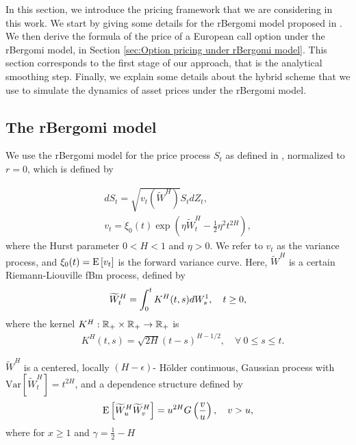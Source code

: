 In this section, we introduce the pricing framework that we are considering in this work. We start  by giving some details for the rBergomi model proposed in \cite{bayer2016pricing}. We then derive the formula of the price of a European call option under the rBergomi model, in Section \ref{sec:Option pricing under rBergomi model}. This section corresponds  to the first stage of our approach, that is the analytical smoothing step. Finally, we explain  some details about the hybrid scheme that we use to simulate the dynamics of asset prices under the rBergomi model.

\subsection{The rBergomi model}\label{sec:The rBergomi model}

We use  the rBergomi model for the price process $S_t$ as defined in  \cite{bayer2016pricing}, normalized to $r=0$, which is defined by

\begin{align}\label{eq:rBergomi_model1}
	dS_t = \sqrt{v_t(\widetilde{W}^H)} S_t dZ_t, \nonumber \\
	v_t = \xi_0(t) \exp\left( \eta \widetilde{W}_t^H - \frac{1}{2} \eta^2 t^{2H} \right),
\end{align}
where the Hurst parameter $0 < H < 1$  and  $\eta>0$. We refer to $v_t$ as the variance process, and $\xi_0(t) = \mathrm{E}\left[v_t\right]$ is  the forward variance curve.  Here, $\widetilde{W}^H $ is a certain Riemann-Liouville fBm
process,  defined by
\begin{align}\label{eq:Volterra process}
	\widetilde{W}_t^H = \int_0^t K^H(t,s) dW_s^1, \quad t \ge 0 ,
\end{align}
where the kernel $K^H : \mathbb{R}_+ \times \mathbb{R}_+ \rightarrow \mathbb{R}_+$ is
\begin{align*}
 \quad K^H(t,s) = \sqrt{2H} (t-s)^{H - 1/2},\quad \forall \: 0 \le s \le t.
\end{align*}

 $\widetilde{W}^H $ is a centered, locally $(H-\epsilon)$- H\"older continuous, Gaussian process with $\text{Var}\left[\widetilde{W}^H_t \right] = t^{2H}$, and a dependence structure defined by 
 \begin{equation*}
 \mathrm{E}\left[\widetilde{W}^H_u  \widetilde{W}^H_v\right]=u^{2H} G\left(\frac{v}{u} \right),\quad v >u ,
 \end{equation*}
 where for $x \ge 1$ and $\gamma=\frac{1}{2}-H$
 
